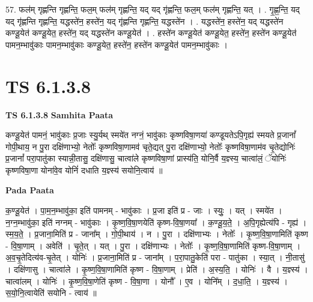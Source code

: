 \documentclass[17pt]{extarticle}
\begin{document}
57. फल॑म् गृह्णन्ति गृह्णन्ति॒ फल॒म् फल॑म् गृह्णन्ति॒ यद् यद् गृ॑ह्णन्ति॒ फल॒म् फल॑म् गृह्णन्ति॒ यत् । . गृ॒ह्ण॒न्ति॒ यद् यद् गृ॑ह्णन्ति गृह्णन्ति॒ यद्धस्ते॑न॒ हस्ते॑न॒ यद् गृ॑ह्णन्ति गृह्णन्ति॒ यद्धस्ते॑न । . यद्धस्ते॑न॒ हस्ते॑न॒ यद् यद्धस्ते॑न कण्डू॒येत॑ कण्डू॒येत॒ हस्ते॑न॒ यद् यद्धस्ते॑न कण्डू॒येत॑ । . हस्ते॑न कण्डू॒येत॑ कण्डू॒येत॒ हस्ते॑न॒ हस्ते॑न कण्डू॒येत॑ पामन॒म्भावु॑काः पामन॒म्भावु॑काः कण्डू॒येत॒ हस्ते॑न॒ हस्ते॑न कण्डू॒येत॑ पामन॒म्भावु॑काः । \newline
\pagebreak
{}

\section{ TS 6.1.3.8 }

\textbf{TS 6.1.3.8 } \newline
\textbf{Samhita Paata} \newline

कण्डू॒येत॑ पामनं॒ भावु॑काः प्र॒जाः स्यु॒र्यथ् स्मये॑त नग्नं॒ भावु॑काः कृष्णविषा॒णया॑ कण्डूयतेऽपि॒गृह्य॑ स्मयते प्र॒जानां᳚ गोपी॒थाय॒ न पु॒रा दक्षि॑णाभ्यो॒ नेतोः᳚ कृष्णविषा॒णामव॑ चृते॒द्यत् पु॒रा दक्षि॑णाभ्यो॒ नेतोः᳚ कृष्णविषा॒णाम॑व चृ॒तेद्योनिः॑ प्र॒जानां᳚ परा॒पातु॑का स्यान्नी॒तासु॒ दक्षि॑णासु॒ चात्वा॑ले कृष्णविषा॒णां प्रास्य॑ति॒ योनि॒र्वै य॒ज्ञ्स्य॒ चात्वा॑लं॒ ॅयोनिः॑ कृष्णविषा॒णा योना॑वे॒व योनिं॑ दधाति य॒ज्ञ्स्य॑ सयोनि॒त्वाय॑ ॥ \newline

\textbf{Pada Paata} \newline

क॒ण्डू॒येत॑ । पा॒म॒न॒म्भावु॑का॒ इति॑ पामनम् - भावु॑काः । प्र॒जा इति॑ प्र - जाः । स्युः॒ । यत् । स्मये॑त । न॒ग्न॒म्भावु॑का॒ इति॑ नग्नम् - भावु॑काः । कृ॒ष्ण॒वि॒षा॒णयेति॑ कृष्ण-वि॒षा॒णया᳚ । क॒ण्डू॒य॒ते॒ । अ॒पि॒गृह्येत्य॑पि - गृह्य॑ । स्म॒य॒ते॒ । प्र॒जाना॒मिति॑ प्र - जाना᳚म् । गो॒पी॒थाय॑ । न । पु॒रा । दक्षि॑णाभ्यः । नेतोः᳚ । कृ॒ष्ण॒वि॒षा॒णामिति॑ कृष्ण - वि॒षा॒णाम् । अवेति॑ । चृ॒ते॒त् । यत् । पु॒रा । दक्षि॑णाभ्यः । नेतोः᳚ । कृ॒ष्ण॒वि॒षा॒णामिति॑ कृष्ण-वि॒षा॒णाम् । अ॒व॒चृ॒तेदित्य॑व-चृ॒तेत् । योनिः॑ । प्र॒जाना॒मिति॑ प्र - जाना᳚म् । प॒रा॒पातु॒केति॑ परा - पातु॑का । स्या॒त् । नी॒तासु॑ । दक्षि॑णासु । चात्वा॑ले । कृ॒ष्ण॒वि॒षा॒णामिति॑ कृष्ण - वि॒षा॒णाम् । प्रेति॑ । अ॒स्य॒ति॒ । योनिः॑ । वै । य॒ज्ञ्स्य॑ । चात्वा॑लम् । योनिः॑ । कृ॒ष्ण॒वि॒षा॒णेति॑ कृष्ण - वि॒षा॒णा । योनौ᳚ । ए॒व । योनि᳚म् । द॒धा॒ति॒ । य॒ज्ञ्स्य॑ । स॒यो॒नि॒त्वायेति॑ सयोनि - त्वाय॑ ॥  \newline
\end{document}
